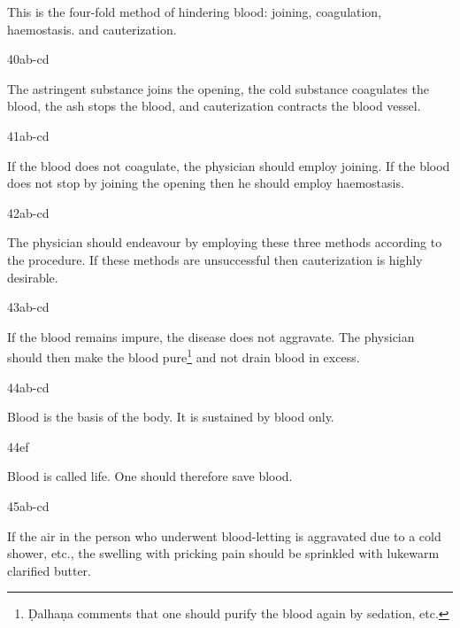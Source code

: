 \begin{translation}
\begin{sloka}
This is the four-fold method of hindering blood: joining, coagulation, 
haemostasis.
and cauterization.  
\end{sloka}

\item[40ab-cd]

\begin{sloka}
The astringent substance joins the opening, the cold substance coagulates the blood, the ash stops the blood, and cauterization contracts the blood vessel.
\end{sloka}

\item[41ab-cd]

\begin{sloka}
If the blood does not coagulate, the physician should employ joining. If the blood does not stop by joining the opening then he should employ haemostasis.
\end{sloka}

\item[42ab-cd]

\begin{sloka}
The physician should endeavour by employing these three methods according to the procedure. If these methods are unsuccessful then cauterization is highly desirable.
\end{sloka}

\item[43ab-cd]

\begin{sloka}
If the blood remains impure, the disease does not aggravate. The physician should 
then make the blood pure\footnote{Ḍalhaṇa comments \citep[66]{vulgate} that 
one should purify the blood again by sedation, etc.} and not 
drain blood in excess.
\end{sloka}

\item[44ab-cd]

\begin{sloka}
Blood is the basis of the body. It is sustained by blood only.
\end{sloka}

\item[44ef]

\begin{sloka}
Blood is called life. One should therefore save blood.
\end{sloka}

\item[45ab-cd]

\begin{sloka}
If the air in the person who underwent blood-letting is aggravated due to a cold shower, etc., the swelling with pricking pain should be sprinkled with lukewarm clarified butter.   
\end{sloka}

\end{translation}


